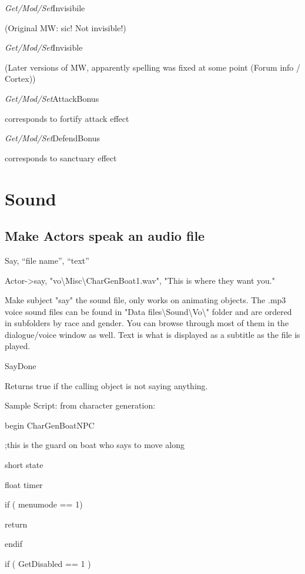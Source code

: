 \documentclass[
]{article}
\begin{document}
\emph{Get/Mod/Set}Invisibile

(Original MW: sic! Not invisible!)

\emph{Get/Mod/Set}Invisible

(Later versions of MW, apparently spelling was fixed at some point
(Forum info / Cortex))

\emph{Get/Mod/Set}AttackBonus

corresponds to fortify attack effect

\emph{Get/Mod/Set}DefendBonus

corresponds to sanctuary effect

\hypertarget{sound}{%
\section{\texorpdfstring{\hfill\break
Sound}{ Sound}}\label{sound}}

\hypertarget{make-actors-speak-an-audio-file}{%
\subsection{Make Actors speak an audio
file}\label{make-actors-speak-an-audio-file}}

Say, ``file name'', ``text''

Actor-\textgreater say,
"vo\textbackslash Misc\textbackslash CharGenBoat1.wav", "This is where
they want you."

Make subject "say" the sound file, only works on animating objects. The
.mp3 voice sound files can be found in "Data
files\textbackslash Sound\textbackslash Vo\textbackslash" folder and are
ordered in subfolders by race and gender. You can browse through most of
them in the dialogue/voice window as well. Text is what is displayed as
a subtitle as the file is played.

SayDone

Returns true if the calling object is not saying anything.

Sample Script: from character generation:

begin CharGenBoatNPC

;this is the guard on boat who says to move along

short state

float timer

if ( menumode == 1)

return

endif

if ( GetDisabled == 1 )
\end{document}
